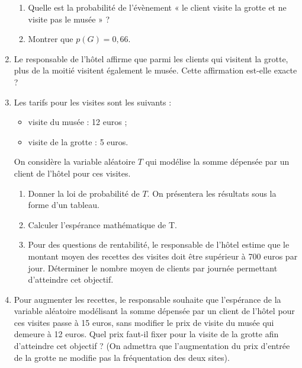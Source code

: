 \documentclass[11pt,fleqn, openany]{book} %
\begin{document}
\begin{exercise}[topic=prob03, subtitle={(Métropole 2022)}]
\begin{enumerate}
\begin{enumerate}
\item Quelle est la probabilité de l'évènement
« le client visite la grotte et ne visite pas
le musée » ?
\item Montrer que $p(G) = 0,66$.
\end{enumerate}
\item Le responsable de l'hôtel affirme que parmi les clients qui visitent la grotte, plus de la moitié
visitent également le musée. Cette affirmation est-elle exacte ?
\item Les tarifs pour les visites sont les suivants :
\begin{itemize}
\item visite du musée : 12 euros ;
\item visite de la grotte : 5 euros.\end{itemize}
On considère la variable aléatoire $T$ qui modélise la somme dépensée par un client de l'hôtel pour ces visites.
\begin{enumerate}
\item Donner la loi de probabilité de $T$. On présentera les résultats sous la forme d'un tableau.
\item Calculer l'espérance mathématique de T.
\item Pour des questions de rentabilité, le responsable de l'hôtel estime que le montant
moyen des recettes des visites doit être supérieur à 700 euros par jour.
Déterminer le nombre moyen de clients par journée permettant d'atteindre cet objectif.\end{enumerate}
\item Pour augmenter les recettes, le responsable souhaite que l'espérance de la variable aléatoire modélisant la somme dépensée par un client de l'hôtel pour ces visites passe à 15 euros, sans modifier le prix de visite du musée qui demeure à 12 euros.
Quel prix faut-il fixer pour la visite de la grotte afin d'atteindre cet objectif ? (On admettra
que l'augmentation du prix d'entrée de la grotte ne modifie pas la fréquentation des deux
sites).\end{enumerate}\end{exercise}
\end{document}

